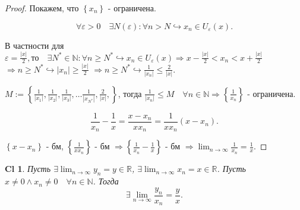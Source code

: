 \documentclass[a5paper, 10pt]{article}
\theoremstyle{plain}
\newtheorem*{corollary_}{Cl}
\newcommand{\N}{\mathbb N}
\newcommand{\R}{\mathbb R}
\newcommand{\eps}{\varepsilon}
\newcommand{\hrarrow}{\hookrightarrow}
\newcommand{\Rarrow}{\Rightarrow}
\begin{document}
    \begin{proof}
        Покажем, что $ \left\{ x_n \right\}  $ - ограничена.

        \[ \forall \eps > 0 \quad \exists N(\eps): \forall n > N \hrarrow x_n \in U_{\eps}(x). \]

        В частности для $ \eps = \frac{|x|}{2}, то \quad \exists N^* \in \N: \forall n \geq N^*
        \hrarrow x_n \in U_{\eps}(x) \Rarrow x - \frac{|x|}{2} < x_n < x + \frac{|x|}{2} $
        $ \Rarrow n \geq N^* \hrarrow |x_n| \geq \frac{|x|}{2} $
        $ \Rarrow n \geq N^* \hrarrow \frac{1}{|x_n|} \leq \frac{2}{|x|}.$

        $ M := \left\{
            \frac{1}{|x_1|},
            \frac{1}{|x_2|},
            \frac{1}{|x_3|},
            \dots
            \frac{1}{|x_{N^*}|},
            \frac{2}{|x|},
        \right\}  $, тогда
        $ \frac{1}{|x_n|} \leq M \quad \forall n \in \N \Rarrow \left\{ \frac{1}{x_n}  \right\} $
        - ограничена.

        \[ \frac{1}{x_n} - \frac{1}{x} = \frac{x - x_n}{x x_n} = \frac{1}{x x_n} (x - x_n). \]

            $ \left\{ x - x_n \right\} $ - бм,
            $ \left\{ \frac{1}{x x_n} \right\} $ - бм
            $ \Rarrow \left\{ \frac{1}{x_n} - \frac{1}{x} \right\} $ - бм
            $ \Rarrow \lim_{n \to \infty} \frac{1}{x_n} = \frac{1}{x}.  $
    \end{proof}

    \begin{corollary_}
        Пусть
        $ \exists \lim_{n \to \infty} y_n = y \in \R $,
        $ \exists \lim_{n \to \infty} x_n = x \in \R $.
        Пусть $ x \neq 0 \land x_n \neq 0 \quad \forall n \in \N $.
        Тогда \[ \exists \lim_{n \to \infty} \frac{y_n}{x_n} = \frac{y}{x}. \]
    \end{corollary_}
\end{document}
